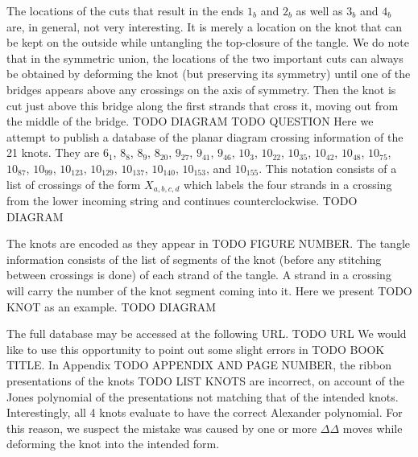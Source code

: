 \begin{paper}
The locations of the cuts that result in the ends $1_b$ and $2_b$ as well as
$3_b$ and $4_b$ are, in general, not very interesting.
It is merely a location on the knot that can be kept on the outside while
untangling the top-closure of the tangle.
We do note that in the symmetric union, the locations of the two important cuts
can always be obtained by deforming the knot (but preserving its symmetry) until
one of the bridges appears above any crossings on the axis of symmetry.
Then the knot is cut just above this bridge along the first strands that cross
it, moving out from the middle of the bridge.
TODO DIAGRAM
TODO QUESTION
Here we attempt to publish a database of the planar diagram crossing information
of the 21 knots.
They are $6_1$, $8_8$, $8_9$, $8_{20}$, $9_{27}$, $9_{41}$, $9_{46}$, $10_3$,
$10_{22}$, $10_{35}$, $10_{42}$, $10_{48}$, $10_{75}$, $10_{87}$, $10_{99}$,
$10_{123}$, $10_{129}$, $10_{137}$, $10_{140}$, $10_{153}$, and $10_{155}$.
This notation consists of a list of crossings of the form $X_{a,b,c,d}$ which
labels the four strands in a crossing from the lower incoming string and
continues counterclockwise.
TODO DIAGRAM

The knots are encoded as they appear in TODO FIGURE NUMBER.
The tangle information consists of the list of segments of the knot (before any
stitching between crossings is done) of each strand of the tangle.
A strand in a crossing will carry the number of the knot segment coming into it.
Here we present TODO KNOT as an example.
TODO DIAGRAM

The full database may be accessed at the following URL.
TODO URL
We would like to use this opportunity to point out some slight errors in TODO
BOOK TITLE.
In Appendix TODO APPENDIX AND PAGE NUMBER, the ribbon presentations of the knots
TODO LIST KNOTS are incorrect, on account of the Jones polynomial of the
presentations not matching that of the intended knots.
Interestingly, all 4 knots evaluate to have the correct Alexander polynomial.
For this reason, we suspect the mistake was caused by one or more $\Delta\Delta$
moves while deforming the knot into the intended form.
\end{paper}

